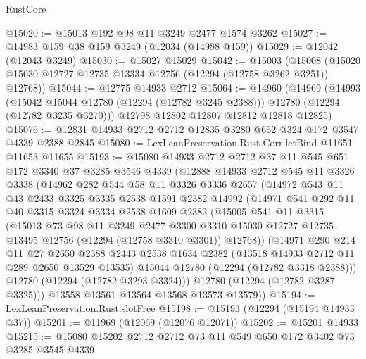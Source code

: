 \begin{lexlean}{RustCore}
\begin{coremodule}
@15020 := @15013 @192 @98 @11 @3249 @2477 @1574 @3262
@15027 := @14983 @159 @38 @159 @3249 (@12034 (@14988 @159))
@15029 := @12042 (@12043 @3249)
@15030 := @15027 @15029
@15042 := @15003
    (@15008 (@15020 @15030 @12727 @12735 @13334 @12756 (@12294 (@12758 @3262 @3251)) @12768))
@15044 := @12775 @14933 @2712
@15064 := @14960
    (@14969
      (@14993
        (@15042 @15044 @12780 (@12294 (@12782 @3245 @2388)))
        @12780
        (@12294 (@12782 @3235 @3270)))
      @12798
      @12802
      @12807
      @12812
      @12818
      @12825)
@15076 := @12831 @14933 @2712 @2712 @12835 @3280 @652 @324 @172 @3547 @4339 @2388 @2845
@15080 := LexLeanPreservation.Rust.Corr.letBind @11651 @11653 @11655
@15193 := @15080
    @14933
    @2712
    @2712
    @37
    @11
    @545
    @651
    @172
    @3340
    @37
    @3285
    @3546
    @4339
    (@12888
      @14933
      @2712
      @545
      @11
      @3326
      @3338
      (@14962
        @282
        @544
        @58
        @11
        @3326
        @3336
        @2657
        (@14972
          @543
          @11
          @43
          @2433
          @3325
          @3335
          @2538
          @1591
          @2382
          @14992
          (@14971
            @541
            @292
            @11
            @40
            @3315
            @3324
            @3334
            @2538
            @1609
            @2382
            (@15005
              @541
              @11
              @3315
              (@15013
                @73
                @98
                @11
                @3249
                @2477
                @3300
                @3310
                @15030
                @12727
                @12735
                @13495
                @12756
                (@12294 (@12758 @3310 @3301))
                @12768))
            (@14971
              @290
              @214
              @11
              @27
              @2650
              @2388
              @2443
              @2538
              @1634
              @2382
              (@13518 @14933 @2712 @11 @289 @2650 @13529 @13535)
              @15044
              @12780
              (@12294 (@12782 @3318 @2388)))
            @12780
            (@12294 (@12782 @3293 @3324)))
          @12780
          (@12294 (@12782 @3287 @3325)))
        @13558
        @13561
        @13564
        @13568
        @13573
        @13579))
@15194 := LexLeanPreservation.Rust.slotFree
@15198 := @15193 (@12294 (@15194 @14933 @37))
@15201 := @11969 (@12069 (@12076 @12071))
@15202 := @15201 @14933
@15215 := @15080 @15202 @2712 @2712 @73 @11 @549 @650 @172 @3402 @73 @3285 @3545 @4339

\end{coremodule}
\end{lexlean}
